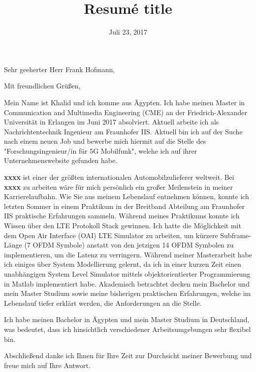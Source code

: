\documentclass[11pt,a4paper,sans]{moderncv}        %
\title{Resumé title}                               %
\begin{document}
\date{Juli 23, 2017}
\opening{Sehr geeherter Herr Frank Hofmann,}
\closing{Mit freundlichen Grüßen,}
\makelettertitle

Mein Name ist Khalid und ich komme aus Ägypten. Ich habe meinen Master in Communication and Multimedia Engineering (CME) an der Friedrich-Alexander Universität in Erlangen im Juni 2017 absolviert.  Aktuell arbeite ich als Nachrichtentechnik Ingenieur am Fraunhofer IIS. Aktuell bin ich auf der Suche nach einem neuen Job und bewerbe mich hiermit auf die Stelle des "Forschungsingenieur/in für 5G Mobilfunk", welche ich auf ihrer Unternehmenswebsite gefunden habe.  

\textbf{xxxx} ist einer der größten internationalen Automobilzulieferer weltweit. Bei \textbf{xxxx} zu arbeiten wäre für mich persönlich ein großer Meilenstein in meiner Karrierelaufbahn. Wie Sie aus meinem Lebenslauf entnehmen können, konnte ich letzten Sommer in einem Praktikum in der Breitband Abteilung am Fraunhofer IIS praktische Erfahrungen sammeln. Während meines Praktikums konnte ich Wissen über den LTE Protokoll Stack gewinnen.  Ich hatte die Möglichkeit mit dem  Open Air Interface (OAI) LTE Simulator zu arbeiten, um kürzere Subframe-Länge (7 OFDM Symbole) anstatt von den jetzigen 14 OFDM Symbolen zu implementieren, um die Latenz zu verringern. Während meiner Masterarbeit habe ich einiges über System Modellierung gelernt, da ich in einer kurzen Zeit einen unabhängigen System Level Simulator mittels objektorientierter Programmierung in Matlab implementiert habe. Akademisch betrachtet decken mein Bachelor und mein Master Studium sowie meine bisherigen praktischen Erfahrungen, welche im Lebenslauf tiefer erklärt werden, die Anforderungen an die Stelle. 

Ich habe meinen Bachelor in Ägypten und mein Master Studium in Deutschland, was bedeutet, dass ich hinsichtlich verschiedener Arbeitsumgebungen sehr flexibel bin. 

Abschließend danke ich Ihnen für Ihre Zeit zur Durchsicht meiner Bewerbung und freue mich auf Ihre Antwort. 




\makeletterclosing
\end{document}
